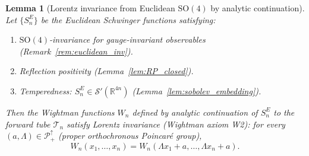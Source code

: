 \documentclass[11pt,a4paper]{amsart}
\newtheorem{lemma}[theorem]{Lemma}
\theoremstyle{definition}
\newcommand{\R}{\mathbb{R}}
\begin{document}
\begin{lemma}[Lorentz invariance from Euclidean $\mathrm{SO}(4)$ by analytic continuation]
\label{lem:lorentz_from_euclidean}
Let $\{S_n^E\}$ be the Euclidean Schwinger functions satisfying:
\begin{enumerate}[label=(\roman*),itemsep=2pt]
\item $\mathrm{SO}(4)$-invariance for gauge-invariant observables
      \textup{(}Remark~\ref{rem:euclidean_inv}\textup{)}.
\item Reflection positivity \textup{(}Lemma~\ref{lem:RP_closed}\textup{)}.
\item Temperedness: $S_n^E \in \mathcal{S}'(\R^{4n})$
      \textup{(}Lemma~\ref{lem:sobolev_embedding}\textup{)}.
\end{enumerate}
Then the Wightman functions $W_n$ defined by analytic continuation of $S_n^E$
to the forward tube $\mathcal{T}_n$ satisfy Lorentz invariance
\textup{(}Wightman axiom W2\textup{)}: for every $(a,\Lambda)\in\mathcal{P}_+^\uparrow$
(proper orthochronous Poincaré group),
\[
  W_n(x_1,\ldots,x_n) = W_n(\Lambda x_1 + a,\ldots,\Lambda x_n + a).
\]
\end{lemma}
\end{document}
